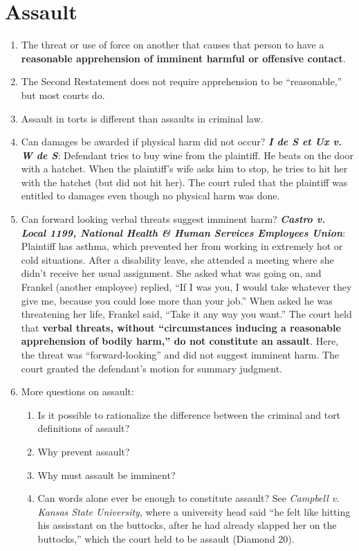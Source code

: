 \section{Assault}

\begin{enumerate}
    \item The threat or use of force on another that causes that person to have a \textbf{reasonable apprehension of imminent harmful or offensive contact}.
    \item The Second Restatement does not require apprehension to be ``reasonable,'' but most courts do.
    \item Assault in torts is different than assaults in criminal law.
    \item Can damages be awarded if physical harm did not occur? \textbf{\emph{I de S et Ux v. W de S}}: Defendant tries to buy wine from the plaintiff. He beats on the door with a hatchet. When the plaintiff's wife asks him to stop, he tries to hit her with the hatchet (but did not hit her). The court ruled that the plaintiff was entitled to damages even though no physical harm was done.
    \item Can forward looking verbal threats suggest imminent harm? \textbf{\emph{Castro v. Local 1199, National Health \& Human Services Employees Union}}: Plaintiff has asthma, which prevented her from working in extremely hot or cold situations. After a disability leave, she attended a meeting where she didn't receive her usual assignment. She asked what was going on, and Frankel (another employee) replied, ``If I was you, I would take whatever they give me, because you could lose more than your job.'' When asked he was threatening her life, Frankel said, ``Take it any way you want.'' The court held that \textbf{verbal threats, without ``circumstances inducing a reasonable apprehension of bodily harm,'' do not constitute an assault}. Here, the threat was ``forward-looking'' and did not suggest imminent harm. The court granted the defendant's motion for summary judgment.
    \item More questions on assault:
    \begin{enumerate}
        \item Is it possible to rationalize the difference between the criminal and tort definitions of assault?
        \item Why prevent assault?
        \item Why must assault be imminent?
        \item Can words alone ever be enough to constitute assault? See \emph{Campbell v. Kansas State University}, where a university head said ``he felt like hitting his assisstant on the buttocks, after he had already slapped her on the buttocks,'' which the court held to be assault (Diamond 20).
    \end{enumerate}
\end{enumerate}
